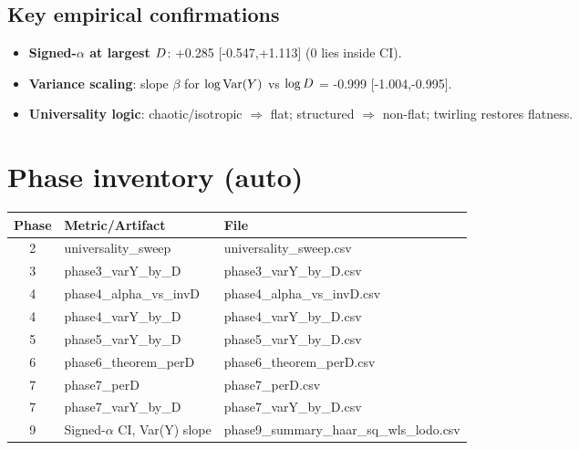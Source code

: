 \subsection*{Key empirical confirmations}
\begin{itemize}
\item \textbf{Signed-$\alpha$ at largest $D$}: +0.285 [-0.547,+1.113] (0 lies inside CI).
\item \textbf{Variance scaling}: slope $\beta$ for $\log \mathrm{Var}(Y)$ vs $\log D$ = -0.999 [-1.004,-0.995].
\item \textbf{Universality logic}: chaotic/isotropic $\Rightarrow$ flat; structured $\Rightarrow$ non-flat; twirling restores flatness.
\end{itemize}

\section*{Phase inventory (auto)}
\begin{tabular}{cll}
\toprule
Phase & Metric/Artifact & File \\
\midrule
2 & universality\_sweep & universality\_sweep.csv \\
3 & phase3\_varY\_by\_D & phase3\_varY\_by\_D.csv \\
4 & phase4\_alpha\_vs\_invD & phase4\_alpha\_vs\_invD.csv \\
4 & phase4\_varY\_by\_D & phase4\_varY\_by\_D.csv \\
5 & phase5\_varY\_by\_D & phase5\_varY\_by\_D.csv \\
6 & phase6\_theorem\_perD & phase6\_theorem\_perD.csv \\
7 & phase7\_perD & phase7\_perD.csv \\
7 & phase7\_varY\_by\_D & phase7\_varY\_by\_D.csv \\
9 & Signed-$\alpha$ CI, Var(Y) slope & phase9\_summary\_haar\_sq\_wls\_lodo.csv \\
\bottomrule
\end{tabular}

